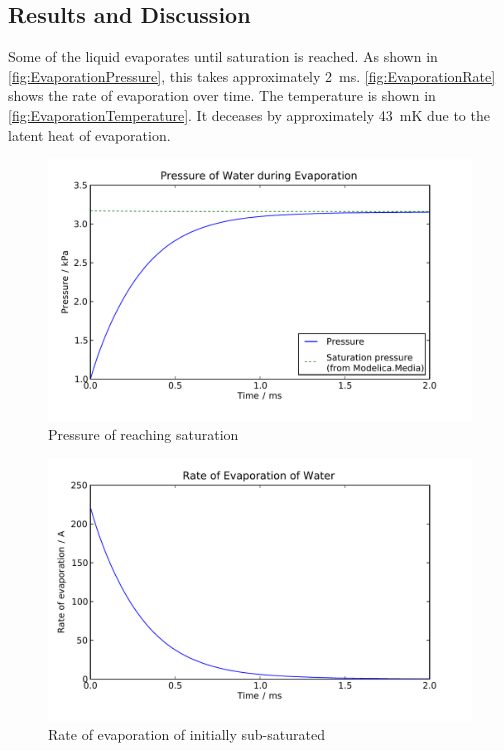 \subsection{Results and Discussion}



Some of the liquid evaporates until saturation is reached.  As shown in \autoref{fig:EvaporationPressure}, this takes approximately \SI{2}{ms}.  \autoref{fig:EvaporationRate} shows the rate of evaporation over time.  The temperature is shown in \autoref{fig:EvaporationTemperature}.  It deceases by approximately \SI{43}{mK} due to the latent heat of evaporation.  

\begin{figure}[htbp]
  \includegraphics[width=\linewidth]{Results/Basic/Evaporation/1/Pressure}%
  \caption{Pressure of  reaching saturation}%
  \label{fig:EvaporationPressure}
\end{figure}

\begin{figure}[htbp]
  \includegraphics[width=\linewidth]{Results/Basic/Evaporation/1/Rate}%
  \caption{Rate of evaporation of initially sub-saturated }%
  \label{fig:EvaporationRate}
\end{figure}

